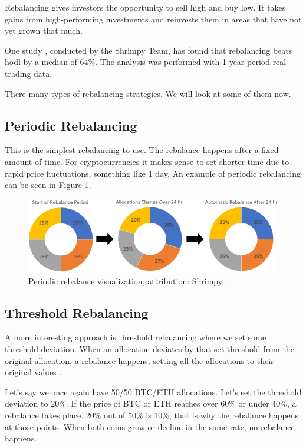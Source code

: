 Rebalancing gives investors the opportunity to sell high and buy low. It takes gains from high-performing investments and reinvests them in areas that have not yet grown that much.

One study \cite{portfolio-rebalancing}, conducted by the Shrimpy Team, has found that rebalancing beats hodl by a median of $64\%$. The analysis was performed with 1-year period real trading data.

There many types of rebalancing strategies. We will look at some of them now.

\subsection*{Periodic Rebalancing}
This is the simplest rebalancing to use. The rebalance happens after a fixed amount of time. For cryptocurrencies it makes sense to set shorter time due to rapid price fluctuations, something like 1 day. An example of periodic rebalancing can be seen in Figure \ref{periodic-rebalance-figure}.

\begin{figure}[ht]
    \centering
    \includegraphics[width=\columnwidth]{figures/periodic-rebalance.png}
    \caption{Periodic rebalance visualization, attribution: Shrimpy \cite{portfolio-rebalancing}.}
    \label{periodic-rebalance-figure}
\end{figure}

\subsection*{Threshold Rebalancing}
A more interesting approach is threshold rebalancing where we set some threshold deviation. When an allocation deviates by that set threshold from the original allocation, a rebalance happens, setting all the allocations to their original values \cite{portfolio-rebalancing}.

Let's say we once again have 50/50 BTC/ETH allocations. Let's set the threshold deviation to $20\%$. If the price of BTC or ETH reaches over 60\% or under 40\%, a rebalance takes place. 20\% out of 50\% is 10\%, that is why the rebalance happens at those points. When both coins grow or decline in the same rate, no rebalance happens.

